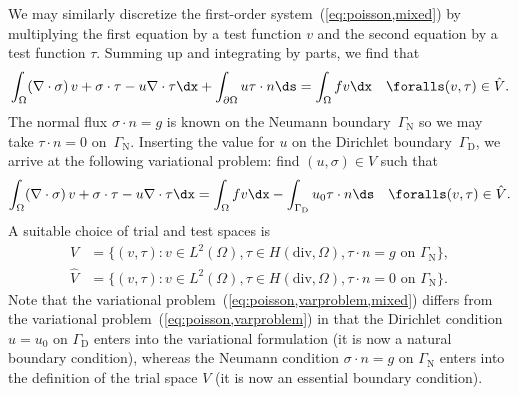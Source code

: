 We may similarly discretize the first-order
system~(\ref{eq:poisson,mixed}) by multiplying the first equation by a
test function $v$ and the second equation by a test function
$\tau$. Summing up and integrating by parts, we find that
\begin{equation}
  \int_{\Omega} (\nabla \cdot \sigma) \, v + \sigma \cdot \tau
  - u \nabla \cdot \tau \dx +
  \int_{\partial\Omega} u \tau \cdot n \ds
  = \int_{\Omega} f v \dx
  \quad \foralls (v, \tau) \in \hat{V}.
\end{equation}
The normal flux $\sigma \cdot n = g$ is known on the Neumann
boundary~$\Gamma_{\mathrm{N}}$ so we may take $\tau \cdot n = 0$
on~$\Gamma_{\mathrm{N}}$.  Inserting the value for $u$ on the
Dirichlet boundary~$\Gamma_{\mathrm{D}}$, we arrive at the following
variational problem: find $(u, \sigma) \in V$ such that
\begin{equation} \label{eq:poisson,varproblem,mixed}
  \int_{\Omega} (\nabla \cdot \sigma) \, v + \sigma \cdot \tau
  - u \nabla \cdot \tau \dx
  = \int_{\Omega} f v \dx - \int_{\Gamma_{\mathrm{D}}} u_0 \tau \cdot n \ds
  \quad \foralls (v, \tau) \in \hat{V}.
\end{equation}
A suitable choice of trial and test spaces is
\begin{equation}
  \begin{split}
    V       &= \{(v, \tau) : v \in L^2(\Omega), \tau \in H(\mathrm{div}, \Omega), \tau \cdot n = g \mbox{ on } \Gamma_{\mathrm{N}}\},
    \\
    \hat{V} &= \{(v, \tau) : v \in L^2(\Omega), \tau \in H(\mathrm{div}, \Omega), \tau \cdot n = 0 \mbox{ on } \Gamma_{\mathrm{N}}\}.
  \end{split}
\end{equation}
Note that the variational problem~(\ref{eq:poisson,varproblem,mixed})
differs from the variational problem~(\ref{eq:poisson,varproblem}) in
that the Dirichlet condition $u = u_0$ on $\Gamma_{\mathrm{D}}$ enters
into the variational formulation (it is now a natural boundary
condition), whereas the Neumann condition $\sigma \cdot n = g$ on
$\Gamma_{\mathrm{N}}$ enters into the definition of the trial space
$V$ (it is now an essential boundary condition).

